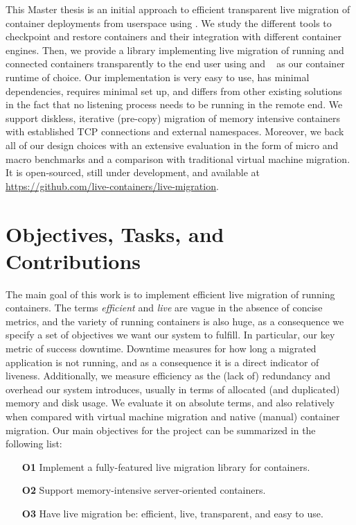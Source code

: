This Master thesis is an initial approach to efficient transparent live migration of container deployments from userspace using \criu.
We study the different tools to checkpoint and restore containers and their integration with different container engines.
Then, we provide a library implementing live migration of running and connected containers transparently to the end user using \criu and \runc~\cite{introducing-runc} as our container runtime of choice.
Our implementation is very easy to use, has minimal dependencies, requires minimal set up, and differs from other existing solutions~\cite{phaul-github} in the fact that no listening process needs to be running in the remote end.
We support diskless, iterative (pre-copy) migration of memory intensive containers with established TCP connections and external namespaces.
Moreover, we back all of our design choices with an extensive evaluation in the form of micro and macro benchmarks and a comparison with traditional virtual machine migration.
It is open-sourced, still under development, and available at \url{https://github.com/live-containers/live-migration}.

\section{Objectives, Tasks, and Contributions}

The main goal of this work is to implement efficient live migration of running containers.
The terms \textit{efficient} and \textit{live} are vague in the absence of concise metrics, and the variety of running containers is also huge, as a consequence we specify a set of objectives we want our system to fulfill.
In particular, our key metric of success downtime.
Downtime measures for how long a migrated application is not running, and as a consequence it is a direct indicator of liveness.
Additionally, we measure efficiency as the (lack of) redundancy and overhead our system introduces, usually in terms of allocated (and duplicated) memory and disk usage.
We evaluate it on absolute terms, and also relatively when compared with virtual machine migration and native (manual) container migration.
Our main objectives for the project can be summarized in the following list:
\begin{itemize}
    \item[\textbf{O1}] Implement a fully-featured live migration library for containers.
    \item[\textbf{O2}] Support memory-intensive server-oriented containers.
    \item[\textbf{O3}] Have live migration be: efficient, live, transparent, and easy to use.
\end{itemize}

